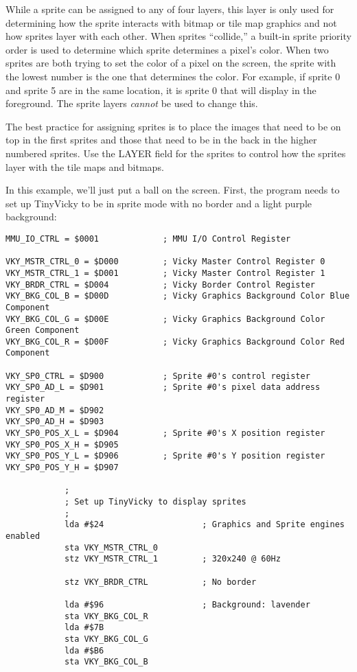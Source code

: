 While a sprite can be assigned to any of four layers, this layer is only used for determining how the sprite interacts with bitmap or tile map graphics and not how sprites layer with each other. When sprites ``collide,'' a built-in sprite priority order is used to determine which sprite determines a pixel's color. When two sprites are both trying to set the color of a pixel on the screen, the sprite with the lowest number is the one that determines the color. For example, if sprite 0 and sprite 5 are in the same location, it is sprite 0 that will display in the foreground. The sprite layers {\em cannot} be used to change this.

The best practice for assigning sprites is to place the images that need to be on top in the first sprites and those that need to be in the back in the higher numbered sprites. Use the LAYER field for the sprites to control how the sprites layer with the tile maps and bitmaps.

In this example, we'll just put a ball on the screen. First, the program needs to set up TinyVicky to be in sprite mode with no border and a light purple background:

\begin{verbatim}
MMU_IO_CTRL = $0001             ; MMU I/O Control Register

VKY_MSTR_CTRL_0 = $D000         ; Vicky Master Control Register 0
VKY_MSTR_CTRL_1 = $D001         ; Vicky Master Control Register 1
VKY_BRDR_CTRL = $D004           ; Vicky Border Control Register
VKY_BKG_COL_B = $D00D           ; Vicky Graphics Background Color Blue Component
VKY_BKG_COL_G = $D00E           ; Vicky Graphics Background Color Green Component
VKY_BKG_COL_R = $D00F           ; Vicky Graphics Background Color Red Component

VKY_SP0_CTRL = $D900            ; Sprite #0's control register
VKY_SP0_AD_L = $D901            ; Sprite #0's pixel data address register
VKY_SP0_AD_M = $D902
VKY_SP0_AD_H = $D903
VKY_SP0_POS_X_L = $D904         ; Sprite #0's X position register
VKY_SP0_POS_X_H = $D905
VKY_SP0_POS_Y_L = $D906         ; Sprite #0's Y position register
VKY_SP0_POS_Y_H = $D907

            ;
            ; Set up TinyVicky to display sprites
            ;
            lda #$24                    ; Graphics and Sprite engines enabled
            sta VKY_MSTR_CTRL_0
            stz VKY_MSTR_CTRL_1         ; 320x240 @ 60Hz

            stz VKY_BRDR_CTRL           ; No border

            lda #$96                    ; Background: lavender
            sta VKY_BKG_COL_R
            lda #$7B
            sta VKY_BKG_COL_G
            lda #$B6
            sta VKY_BKG_COL_B
\end{verbatim}

